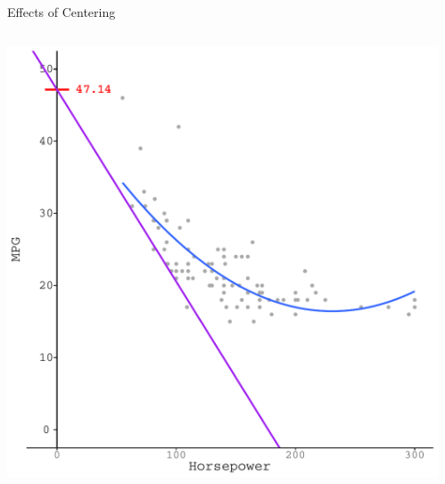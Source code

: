 \documentclass{beamer}\usepackage[]{graphicx}\usepackage[]{color}
\makeatletter
\def\maxwidth{ %
  \ifdim\Gin@nat@width>\linewidth
    \linewidth
  \else
    \Gin@nat@width
  \fi
}
\newenvironment{knitrout}{}{} %
\makeatother
\begin{document}
\begin{frame}{Effects of Centering}
  
  \begin{columns}
    \begin{column}{0.5\textwidth}
      
\begin{knitrout}\footnotesize
{}\color{fgcolor}

{\centering \includegraphics[width=\maxwidth]{figure/unnamed-chunk-35-1} 

}



\end{knitrout}

\end{column}
    
    \begin{column}{0.5\textwidth}
      
\begin{knitrout}\footnotesize
{}\color{fgcolor}


\end{knitrout}
\end{column}
\end{columns}
\end{frame}
\end{document}
